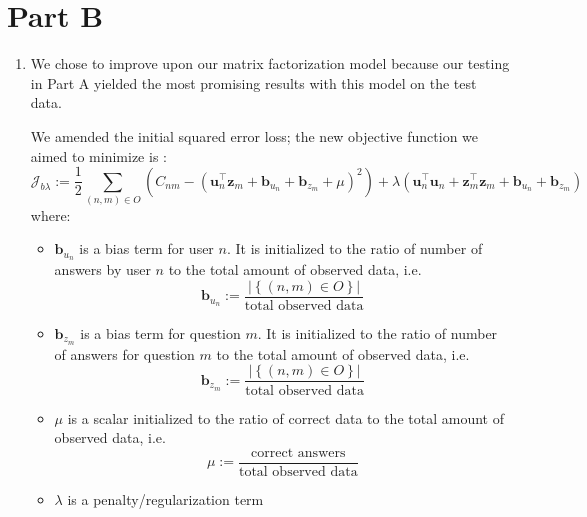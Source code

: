 \documentclass{article}
\newcommand{\mbf}[1]{\mathbf{#1}}
\begin{document}
\newpage
\section{Part B}
\begin{enumerate}[label=\arabic*.]
    \item We chose to improve upon our matrix factorization model because our testing in Part A yielded the most promising results with this model on the test data. 

        We amended the initial squared error loss; the new objective function we aimed to minimize is \cite{netflix}: \[
            \mathcal{J}_{b\lambda} := \frac{1}{2}\sum_{(n, m)\in O}{\left(C_{nm}-\left(\mbf u_n^\top \mbf z_m+\mbf b_{u_n}+\mbf b_{z_m}+\mu\right)^2\right)+\lambda \left(\mbf u_n^\top\mbf u_n+\mbf z_m^\top\mbf z_m+\mbf b_{u_n}+\mbf b_{z_m}\right)}
        \] where:
        \begin{itemize}
            \item $\mbf b_{u_n}$ is a bias term for user $n$. It is initialized to the ratio of number of answers by user $n$ to the total amount of observed data, i.e. \[
                    \mbf b_{u_n} := \frac{\left|\left\{(n, m)\in O\right\}\right|}{\text{total observed data}}
            \] 
            \item $\mbf b_{z_m}$ is a bias term for question $m$. It is initialized to the ratio of number of answers for question $m$ to the total amount of observed data, i.e. \[
                    \mbf b_{z_m} := \frac{\left|\left\{(n, m)\in O\right\}\right|}{\text{total observed data}}
            \] 
            \item $\mu$ is a scalar initialized to the ratio of correct data to the total amount of observed data, i.e. \[
            \mu := \frac{\text{correct answers}}{\text{total observed data}}
            \] 
            \item $\lambda$ is a penalty/regularization term
        \end{itemize}


\end{enumerate}
\end{document}
